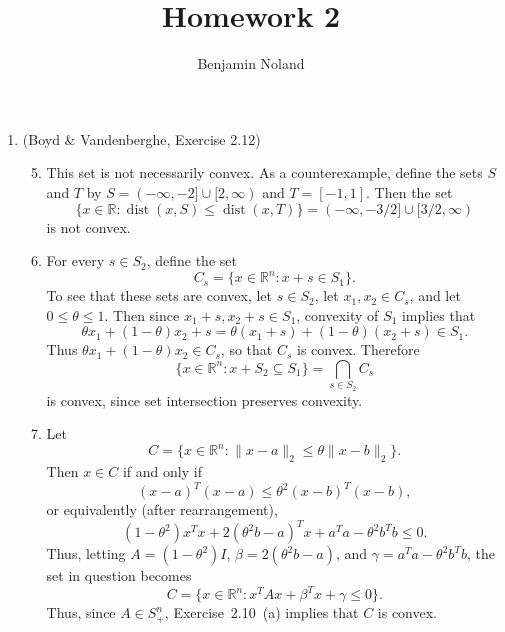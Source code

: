 \documentclass[letterpaper,12pt]{article}
\title{Homework 2}
\author{Benjamin Noland}
\date{}
\DeclareMathOperator{\dist}{dist}
\begin{document}
\maketitle

\begin{enumerate}
\item (Boyd \& Vandenberghe, Exercise 2.12)
\begin{enumerate}
\setcounter{enumii}{4}
\item This set is not necessarily convex. As a counterexample, define
  the sets $S$ and $T$ by $S = (-\infty, -2] \cup [2, \infty)$ and
  $T = [-1, 1]$. Then the set
  \begin{equation*}
    \{x \in \mathbb{R} : \dist(x, S) \leq \dist(x, T)\}
      = (-\infty, -3/2] \cup [3/2, \infty)
  \end{equation*}
  is not convex.

\item For every $s \in S_2$, define the set
  \begin{equation*}
    C_s = \{x \in \mathbb{R}^n : x + s \in S_1\}.
  \end{equation*}
  To see that these sets are convex, let $s \in S_2$, let
  $x_1, x_2 \in C_s$, and let $0 \leq \theta \leq 1$. Then since
  $x_1 + s, x_2 + s \in S_1$, convexity of $S_1$ implies that
  \begin{equation*}
    \theta x_1 + (1 - \theta)x_2 + s
      = \theta (x_1 + s) + (1 - \theta)(x_2 + s) \in S_1.
  \end{equation*}
  Thus $\theta x_1 + (1 - \theta)x_2 \in C_s$, so that $C_s$ is
  convex. Therefore
  \begin{equation*}
    \{x \in \mathbb{R}^n : x + S_2 \subseteq S_1\} = \bigcap_{s \in S_2} C_s
  \end{equation*}
  is convex, since set intersection preserves convexity.

\item Let
  \begin{equation*}
    C = \{x \in \mathbb{R}^n :
      \lVert x - a \rVert_2 \leq \theta \lVert x - b \rVert_2\}.
  \end{equation*}
  Then $x \in C$ if and only if
  \begin{equation*}
    (x - a)^T (x - a) \leq \theta^2 (x - b)^T (x - b),
  \end{equation*}
  or equivalently (after rearrangement),
  \begin{equation*}
    (1 - \theta^2) x^T x + 2(\theta^2 b - a)^T x
      + a^T a - \theta^2 b^T b \leq 0.
  \end{equation*}
  Thus, letting $A = (1 - \theta^2)I$, $\beta = 2(\theta^2 b - a)$,
  and $\gamma = a^T a - \theta^2 b^T b$, the set in question becomes
  \begin{equation*}
    C = \{x \in \mathbb{R}^n : x^T Ax + \beta^T x + \gamma \leq 0\}.
  \end{equation*}
  Thus, since $A \in S^n_{+}$, Exercise~2.10~(a) implies that $C$ is
  convex.
\end{enumerate}


\end{enumerate}
\end{document}
